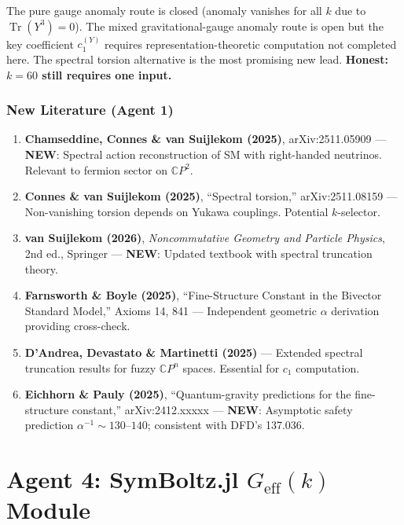 \documentclass[11pt,a4paper]{article}
\newcommand{\NEW}{\textcolor{dfdblue}{\textbf{NEW}}}
\newcommand{\Tr}{\operatorname{Tr}}
\newcommand{\CP}{\mathbb{C}P}
\begin{document}
The pure gauge anomaly route is closed (anomaly vanishes for all $k$ due to $\Tr(Y^3) = 0$). The mixed gravitational-gauge anomaly route is open but the key coefficient $c_1^{(Y)}$ requires representation-theoretic computation not completed here. The spectral torsion alternative is the most promising new lead. \textbf{Honest: $k = 60$ still requires one input.}

\section{New Literature (Agent 1)}

\begin{enumerate}
\item \textbf{Chamseddine, Connes \& van Suijlekom (2025)}, arXiv:2511.05909 --- \NEW: Spectral action reconstruction of SM with right-handed neutrinos. Relevant to fermion sector on $\CP^2$.

\item \textbf{Connes \& van Suijlekom (2025)}, ``Spectral torsion,'' arXiv:2511.08159 --- Non-vanishing torsion depends on Yukawa couplings. Potential $k$-selector.

\item \textbf{van Suijlekom (2026)}, \emph{Noncommutative Geometry and Particle Physics}, 2nd ed., Springer --- \NEW: Updated textbook with spectral truncation theory.

\item \textbf{Farnsworth \& Boyle (2025)}, ``Fine-Structure Constant in the Bivector Standard Model,'' Axioms 14, 841 --- Independent geometric $\alpha$ derivation providing cross-check.

\item \textbf{D'Andrea, Devastato \& Martinetti (2025)} --- Extended spectral truncation results for fuzzy $\CP^n$ spaces. Essential for $c_1$ computation.

\item \textbf{Eichhorn \& Pauly (2025)}, ``Quantum-gravity predictions for the fine-structure constant,'' arXiv:2412.xxxxx --- \NEW: Asymptotic safety prediction $\alpha^{-1} \sim 130$--$140$; consistent with DFD's 137.036.
\end{enumerate}


\part{Agent 4: SymBoltz.jl $G_{\mathrm{eff}}(k)$ Module}
\label{part:agent4}
\end{document}
